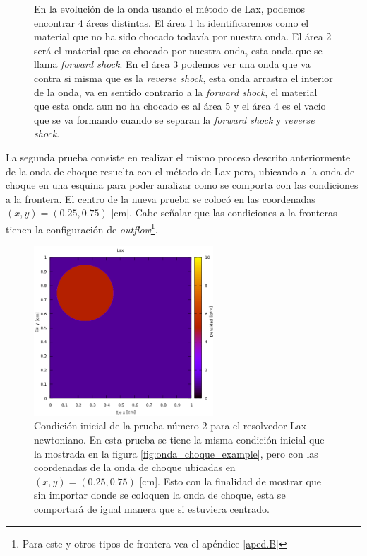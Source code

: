 \documentclass[12pt,a4paper]{book}
\begin{document}
\begin{figure}[H]
\caption{\label{fig:Lax-newtoniano-prueba1-analisis}En la evolución de la onda usando el método de Lax, podemos encontrar 4 áreas distintas. El área 1 la identificaremos como el material que no ha sido chocado todavía por nuestra onda. El área 2 será el material que es chocado por nuestra onda, esta onda que se llama \emph{forward shock}. En el área 3 podemos ver una onda que va contra si misma que es la \emph{reverse shock}, esta onda arrastra el interior de la onda, va en sentido contrario a la \emph{forward shock}, el material que esta onda aun no ha chocado es al área 5 y el área 4 es el vacío que se va formando cuando se separan la \emph{forward shock} y \emph{reverse shock}.} 
\end{figure}


La segunda prueba consiste en realizar el mismo proceso descrito anteriormente de la onda de choque resuelta con el método de Lax pero, ubicando a la onda de choque en una esquina para poder analizar como se comporta con las condiciones a la frontera. El centro de la nueva prueba se colocó en las coordenadas $(x, y) = (0.25, 0.75)$ [cm]. Cabe señalar que las condiciones a la fronteras tienen la configuración de \textit{outflow}\footnote{Para este y otros tipos de frontera vea el apéndice \ref{aped.B}}.

\begin{figure}[H] \label{fig:onda_choque2_t_0}
\centering
\includegraphics[width=0.6\textwidth]{./Figuras/Pruebas/Prueba_onda_choque/onda_choque2_t_0}
\caption{Condición inicial de la prueba número 2 para el resolvedor Lax newtoniano. En esta prueba se tiene la misma condición inicial que la mostrada en la figura \ref{fig:onda_choque_example}, pero con las coordenadas de la onda de choque ubicadas en $(x, y) = (0.25, 0.75)$ [cm]. Esto con la finalidad de mostrar que sin importar donde se coloquen la onda de choque, esta se comportará de igual manera que si estuviera centrado.} 
\end{figure}
\end{document}
